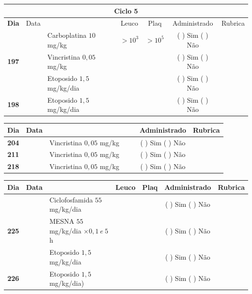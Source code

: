 \documentclass[11pt,a4paper,oldfontcommands]{memoir}
\begin{document}
\begin{center}
\begin{longtable}{p{1cm}c|p{5cm}|p{1.5cm}p{1.5cm}|c|c}
	\hline
	\multicolumn{7}{c}{Ciclo 5} \\
	\hline
	\multicolumn{1}{c|}{\multirow{1}{*}{\textbf{Dia}}}&{Data}&{}&\multicolumn{1}{c|}{Leuco}&\multicolumn{1}{c|}{Plaq}&{Administrado}&{Rubrica} \\
    \hline
    \multicolumn{1}{c|}{\multirow{3}{*}{\textbf{197}}}&\multirow{2}{*}{}&{Carboplatina \(10\) mg/kg}&\multicolumn{1}{c|}{\(>10^3\)}&\multicolumn{1}{c|}{\(>10^5\)}&{(  ) Sim (  ) Não}&\\
    \cline{4-5}
    \multicolumn{1}{c|}{}&&{Vincristina \(0,05\) mg/kg}&\multicolumn{1}{c|}{}&&{(  ) Sim (  ) Não}&\\
    \cline{4-5}
    \multicolumn{1}{c|}{}&\multirow{1}{*}{}&{Etoposido \(1,5\) mg/kg/dia}&{}&&{(  ) Sim (  ) Não}&\\
    \cline{1-3}\cline{6-6}
    \multicolumn{1}{c|}{\textbf{198}}&\multirow{1}{*}{}&{Etoposido \(1,5\) mg/kg/dia}&{}&&{(  ) Sim (  ) Não}&\\
    \hline
\end{longtable}
\begin{longtable}{p{1cm}c|p{4cm}|p{2cm}p{2cm}|c|c}
	\hline
	\multicolumn{1}{c|}{\multirow{1}{*}{\textbf{Dia}}}&{Data}&{}&{}&&{Administrado}&{Rubrica} \\
    \hline
    \multicolumn{1}{c|}{\textbf{204}}&&{Vincristina \(0,05\) mg/kg}&\multicolumn{1}{c}{}&&{(  ) Sim (  ) Não}&\\
    \hline
    \multicolumn{1}{c|}{\textbf{211}}&&{Vincristina \(0,05\) mg/kg}&\multicolumn{1}{c}{}&&{(  ) Sim (  ) Não}&\\
    \hline
    \multicolumn{1}{c|}{\textbf{218}}&&{Vincristina \(0,05\) mg/kg}&\multicolumn{1}{c}{}&&{(  ) Sim (  ) Não}&\\
    \hline
\end{longtable}

\begin{longtable}{p{1cm}c|p{5cm}|p{1.5cm}p{1.5cm}|c|c}
	\hline
	\multicolumn{1}{c|}{\multirow{1}{*}{\textbf{Dia}}}&{Data}&{}&\multicolumn{1}{c|}{Leuco}&\multicolumn{1}{c|}{Plaq}&{Administrado}&{Rubrica} \\
    \hline
    \multicolumn{1}{c|}{\multirow{3}{*}{\textbf{225}}}&&{Ciclofosfamida \(55\) mg/kg/dia}&\multicolumn{1}{c|}{}&&{(  ) Sim (  ) Não}&\\
    \cline{4-5}
    \multicolumn{1}{c|}{}&&{MESNA \(55\) mg/kg/dia \(\times 0,1 \:e\: 5\)h}&&&{(  ) Sim (  ) Não}&\\
    \multicolumn{1}{c|}{}&&{Etoposido \(1,5\) mg/kg/dia}&&&{(  ) Sim (  ) Não}&\\
    \hline
    \multicolumn{1}{c|}{\multirow{1}{*}{\textbf{226}}}&&{Etoposido \(1,5\) mg/kg/dia)}&{}&&{(  ) Sim (  ) Não}&\\
    \hline
\end{longtable}
\end{center}
\end{document}

